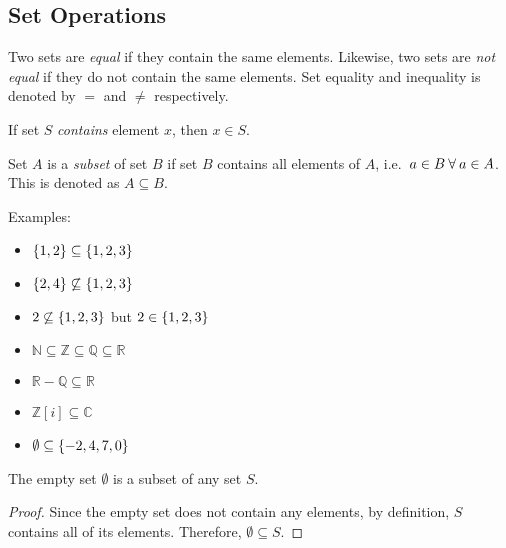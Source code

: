 \subsection{Set Operations}
\begin{definition}
    Two sets are \emph{equal} if they contain the same elements. Likewise, two sets are \emph{not equal} 
    if they do not contain the same elements. Set equality and inequality is denoted by \(=\) and \(\ne\) respectively.   
\end{definition}

\bigskip
\begin{definition}
    If set \(S\) \emph{contains} element \(x\), then \(x\in S\). 
\end{definition}

\bigskip
\begin{definition}
    Set \(A\) is a \emph{subset} of set \(B\) if set \(B\) contains all elements of \(A\), i.e.\ \newline\(a\in B\:\forall\: a\in A\).
    This is denoted as \(A\subseteq B\).
\end{definition}

Examples:
\begin{itemize}
    \item \(\{1,2\}\subseteq\{1,2,3\}\)
    \item \(\{2,4\}\not\subseteq\{1,2,3\}\)
    \item \(2\not\subseteq\{1,2,3\}\) but \(2\in\{1,2,3\}\)
    \item \(\mathbb{N}\subseteq\mathbb{Z}\subseteq\mathbb{Q}\subseteq\mathbb{R}\)
    \item \(\mathbb{R}-\mathbb{Q}\subseteq\mathbb{R}\)
    \item \(\mathbb{Z}[i]\subseteq\mathbb{C}\)
    \item \(\emptyset\subseteq\{-2,4,7,0\}\)
\end{itemize}

\newpage
\bigskip
\begin{proposition}
    The empty set \(\emptyset\) is a subset of any set \(S\).
\end{proposition}
\begin{proof}
    Since the empty set does not contain any elements, by definition, \(S\) contains all of its elements. Therefore, \(\emptyset\subseteq S\).
\end{proof}

